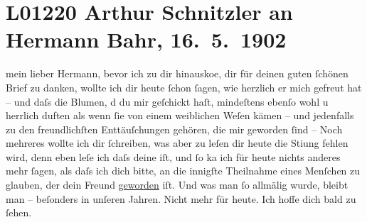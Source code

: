 

\section[Arthur Schnitzler an Hermann Bahr, 16. 5. 1902]{L01220 Arthur Schnitzler an Hermann Bahr, 16. 5. 1902}
\nopagebreak{}
\rehead{ }\normalsize\beginnumbering{}
\toendnotes[C]{\smallbreak\pagebreak[2]}
\toendnotes[C]{\smallbreak}
\pstart{}{\pb}mein lieber
                  Hermann,\pend\vspace{0.5em}
\pstart
           bevor ich zu dir hinausko{\geminationm}e, dir für deinen guten
               ſchönen Brief zu danken, wollte ich dir heute ſchon ſagen, wie herzlich er mich
               gefreut hat – und daſs die Blumen, d du mir \introOben{}ge\introOben{}ſchickt haſt, mindeſtens ebenſo wohl u
               herrlich duften als wenn ſie von einem weiblichen Weſen kämen – und je{\pb}denfalls zu den
               freundlichſten Enttäuſchungen gehören, die mir geworden ſind – Noch mehreres wollte
               ich dir ſchreiben, was aber zu leſen dir heute die Sti{\geminationm}ung fehlen wird, denn eben leſe ich daſs deine \label{K_L01220-1v}\label{K_L01220-1} iſt, und ſo ka{\geminationn} ich für heute nichts anderes mehr ſagen, als daſs ich
               dich bitte, an die innigſte {\pb}Theilnahme eines
               Menſchen zu glauben, der dein Freund \uline{geworden} iſt.
               Und was man ſo allmälig wurde, bleibt man – beſonders in unſeren Jahren. Nicht mehr
               für heute. Ich hoffe dich bald zu ſehen.\pend
           
